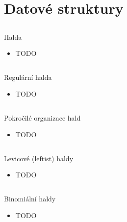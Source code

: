 \documentclass{beamer}
\begin{document}
\section{Datové struktury}

\subsection{}
\begin{frame}{Halda}
\begin{itemize}
\item TODO
\end{itemize}
\end{frame}

\subsection{}
\begin{frame}{Regulární halda}
\begin{itemize}
\item TODO
\end{itemize}
\end{frame}

\subsection{}
\begin{frame}{Pokročilé organizace hald}
\begin{itemize}
\item TODO
\end{itemize}
\end{frame}

\subsection{}
\begin{frame}{Levicové (leftist) haldy}
\begin{itemize}
\item TODO
\end{itemize}
\end{frame}

\subsection{}
\begin{frame}{Binomiální haldy}
\begin{itemize}
\item TODO
\end{itemize}
\end{frame}
\end{document}
